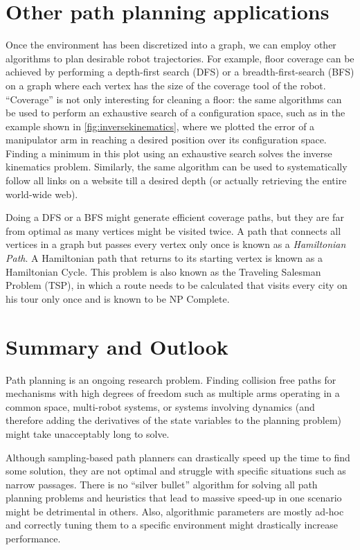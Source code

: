 \section{Other path planning applications}

Once the environment has been discretized into a graph, we can employ other algorithms to plan desirable robot trajectories. For example, floor coverage can be achieved by performing a depth-first search (DFS) or a breadth-first-search (BFS) on a graph where each vertex has the size of the coverage tool of the robot. ``Coverage'' is not only interesting for cleaning a floor: the same algorithms can be used to perform an exhaustive search of a configuration space, such as in the example shown in \cref{fig:inversekinematics}, where we plotted the error of a manipulator arm in reaching a desired position over its configuration space. Finding a minimum in this plot using an exhaustive search solves the inverse kinematics problem. Similarly, the same algorithm can be used to systematically follow all links on a website till a desired depth (or actually retrieving the entire world-wide web).

Doing a DFS or a BFS might generate efficient coverage paths, but they are far from optimal as many vertices might be visited twice. A path that connects all vertices in a graph but passes every vertex only once is known as a \textsl{Hamiltonian Path}. A Hamiltonian path that returns to its starting vertex is known as a Hamiltonian Cycle. This problem is also known as the Traveling Salesman Problem (TSP), in which a route needs to be calculated that visits every city on his tour only once and is known to be NP Complete.


\section{Summary and Outlook}
Path planning is an ongoing research problem. Finding collision free paths for mechanisms with high degrees of freedom such as multiple arms operating in a common space, multi-robot systems, or systems involving dynamics (and therefore adding the derivatives of the state variables to the planning problem) might take unacceptably long to solve.

Although sampling-based path planners can drastically speed up the time to find some solution, they are not optimal and struggle with specific situations such as narrow passages. There is no ``silver bullet'' algorithm for solving all path planning problems and heuristics that lead to massive speed-up in one scenario might be detrimental in others. Also, algorithmic parameters are mostly ad-hoc and correctly tuning them to a specific environment might drastically increase performance.


